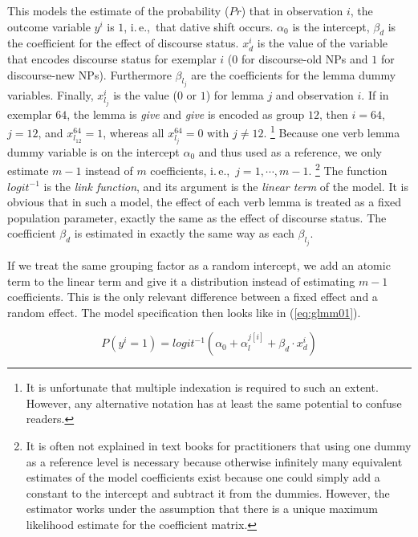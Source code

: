 \documentclass[a4paper,12pt]{article}
\newcommand{\ie}{i.\,e.,\ }
\begin{document}
This models the estimate of the probability ($Pr$) that in observation $i$, the outcome variable $y^i$ is $1$, \ie that dative shift occurs.
$\alpha_0$ is the intercept, $\beta_d$ is the coefficient for the effect of discourse status.
$x_d^i$ is the value of the variable that encodes discourse status for exemplar $i$ ($0$ for discourse-old NPs and $1$ for discourse-new NPs).
Furthermore $\beta_{l_j}$ are the coefficients for the lemma dummy variables.
Finally, $x_{l_j}^i$ is the value ($0$ or $1$) for lemma $j$ and observation $i$.
If in exemplar $64$, the lemma is \textit{give} and \textit{give} is encoded as group $12$, then $i=64$, $j=12$, and $x_{l_{12}}^{64}=1$, whereas all $x_{l_j}^{64}=0$ with $j\neq12$.%
\footnote{It is unfortunate that multiple indexation is required to such an extent.
However, any alternative notation has at least the same potential to confuse readers.}
Because one verb lemma dummy variable is on the intercept $\alpha_0$ and thus used as a reference, we only estimate $m-1$ instead of $m$ coefficients, \ie $j=1,\cdots,m-1$.%
\footnote{It is often not explained in text books for practitioners that using one dummy as a reference level is necessary because otherwise infinitely many equivalent estimates of the model coefficients exist because one could simply add a constant to the intercept and subtract it from the dummies.
However, the estimator works under the assumption that there is a unique maximum likelihood estimate for the coefficient matrix.}
The function $logit^{-1}$ is the \textit{link function}, and its argument is the \textit{linear term} of the model.
It is obvious that in such a model, the effect of each verb lemma is treated as a fixed population parameter, exactly the same as the effect of discourse status.
The coefficient $\beta_d$ is estimated in exactly the same way as each $\beta_{l_j}$.

If we treat the same grouping factor as a random intercept, we add an atomic term to the linear term and give it a distribution instead of estimating $m-1$ coefficients.
This is the only relevant difference between a fixed effect and a random effect.
The model specification then looks like in (\ref{eq:glmm01}).

\begin{equation}
  P(y^i=1)=logit^{-1}(\alpha_0+\alpha_{l}^{j[i]}+\beta_d\cdot x_d^i)
  \label{eq:glmm01}
\end{equation}
\end{document}
